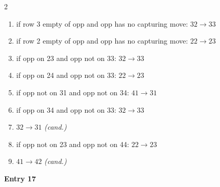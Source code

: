 \begin{multicols}{2}
\begin{tikzpicture}[scale=0.24]
\end{tikzpicture}
\nopagebreak\begin{enumerate}[topsep=1pt,itemsep=0pt,parsep=0pt,leftmargin=2.2em,label=\arabic*.]
\item if row 3 empty of opp and opp has no capturing move: $32\!\to\!33$
\item if row 2 empty of opp and opp has no capturing move: $22\!\to\!23$
\item if opp on 23 and opp not on 33: $32\!\to\!33$
\item if opp on 24 and opp not on 33: $22\!\to\!23$
\item if opp not on 31 and opp not on 34: $41\!\to\!31$
\item if opp on 34 and opp not on 33: $32\!\to\!33$
\item $32\!\to\!31$ \hfill\textit{(cand.)}
\item if opp not on 23 and opp not on 44: $22\!\to\!23$
\item $41\!\to\!42$ \hfill\textit{(cand.)}
\end{enumerate}\smallskip
\noindent\textbf{Entry 17} \; 
\end{multicols}
